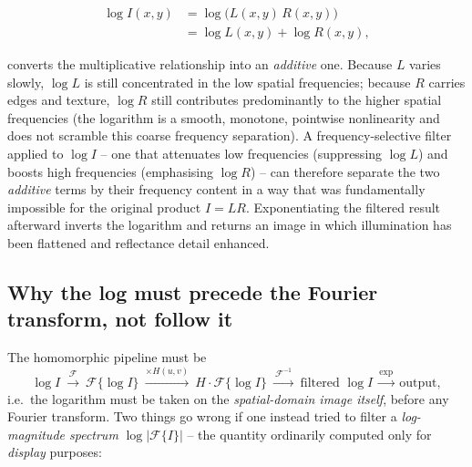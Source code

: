 \documentclass[11pt]{article}
\begin{document}
\begin{align}
  \log I(x,y) &= \log\big(L(x,y)\,R(x,y)\big) \nonumber \\
              &= \log L(x,y) + \log R(x,y),
  \label{eq:logadd}
\end{align}

converts the multiplicative relationship into an \emph{additive} one. Because $L$ varies
slowly, $\log L$ is still concentrated in the low spatial frequencies; because $R$ carries
edges and texture, $\log R$ still contributes predominantly to the higher spatial
frequencies (the logarithm is a smooth, monotone, pointwise nonlinearity and does not
scramble this coarse frequency separation). A frequency-selective filter applied to
$\log I$ -- one that attenuates low frequencies (suppressing $\log L$) and boosts high
frequencies (emphasising $\log R$) -- can therefore separate the two \emph{additive}
terms by their frequency content in a way that was fundamentally impossible for the
original product $I = L R$. Exponentiating the filtered result afterward inverts the
logarithm and returns an image in which illumination has been flattened and reflectance
detail enhanced.

\subsection{Why the log must precede the Fourier transform, not follow it}

The homomorphic pipeline must be
\[
  \log I \ \xrightarrow{\ \mathcal{F}\ }\ \mathcal{F}\{\log I\} \ \xrightarrow{\times H(u,v)}\ H\cdot\mathcal{F}\{\log I\} \ \xrightarrow{\ \mathcal{F}^{-1}\ }\ \text{filtered } \log I \ \xrightarrow{\exp}\ \text{output},
\]
i.e.\ the logarithm must be taken on the \emph{spatial-domain image itself}, before any
Fourier transform. Two things go wrong if one instead tried to filter a
\emph{log-magnitude spectrum} $\log|\mathcal{F}\{I\}|$ -- the quantity ordinarily
computed only for \emph{display} purposes:
\end{document}

